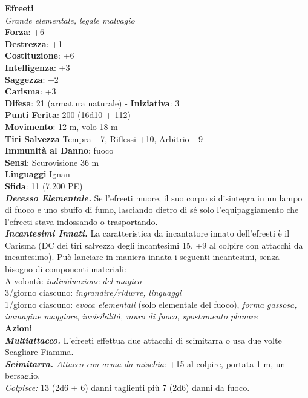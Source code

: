 \begin{multicols}{2}
\medskip\textbf{Efreeti}\\
\emph{Grande elementale, legale malvagio}\\
\textbf{Forza}: +6\\
\textbf{Destrezza}: +1\\
\textbf{Costituzione}: +6\\
\textbf{Intelligenza}: +3\\
\textbf{Saggezza}: +2\\
\textbf{Carisma}: +3\\
\textbf{Difesa}: 21 (armatura naturale) - \textbf{Iniziativa}: 3\\
\textbf{Punti Ferita}: 200 (16d10 + 112) \\
\textbf{Movimento}: 12 m, volo 18 m\\
\textbf{Tiri Salvezza} Tempra +7, Riflessi +10, Arbitrio +9\\
\textbf{Immunità al Danno}: fuoco\\
\textbf{Sensi}: Scurovisione 36 m\\
\textbf{Linguaggi} Ignan\\
\textbf{Sfida}: 11 (7.200 PE)\smallskip\\
\emph{\textbf{Decesso Elementale.}} Se l'efreeti muore, il suo corpo si disintegra in un lampo di fuoco e uno sbuffo di fumo, lasciando dietro di sé solo l'equipaggiamento che l'efreeti stava indossando o trasportando.\\
\emph{\textbf{Incantesimi Innati.}} La caratteristica da incantatore innato dell'efreeti è il Carisma (DC dei tiri salvezza degli incantesimi 15, +9 al colpire con attacchi da incantesimo). Può lanciare in maniera innata i seguenti incantesimi, senza bisogno di componenti materiali:\\
A volontà: \emph{individuazione del magico}\\
3/giorno ciascuno: \emph{ingrandire/ridurre, linguaggi}\\
1/giorno ciascuno: \emph{evoca elementali} (solo elementale del fuoco), \emph{forma gassosa, immagine maggiore}, \emph{invisibilità, muro di fuoco, spostamento planare}\\
\smallskip\textbf{Azioni}\\
\emph{\textbf{Multiattacco.}} L'efreeti effettua due attacchi di scimitarra o usa due volte Scagliare Fiamma.\\
\emph{\textbf{Scimitarra.} Attacco con arma da mischia}: +15 al colpire, portata 1 m, un bersaglio.\\
\emph{Colpisce:} 13 (2d6 + 6) danni taglienti più 7 (2d6) danni da fuoco.\\

\end{multicols}

